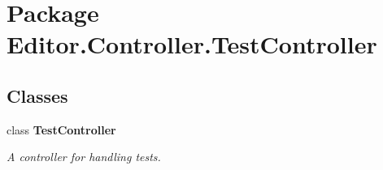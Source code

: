 \section{Package Editor.\-Controller.\-Test\-Controller}
\label{namespace_editor_1_1_controller_1_1_test_controller}
\subsection*{Classes}
\begin{DoxyCompactItemize}
\item 
class {\bf Test\-Controller}
\begin{DoxyCompactList}\small\item\em A controller for handling tests. \end{DoxyCompactList}\end{DoxyCompactItemize}
